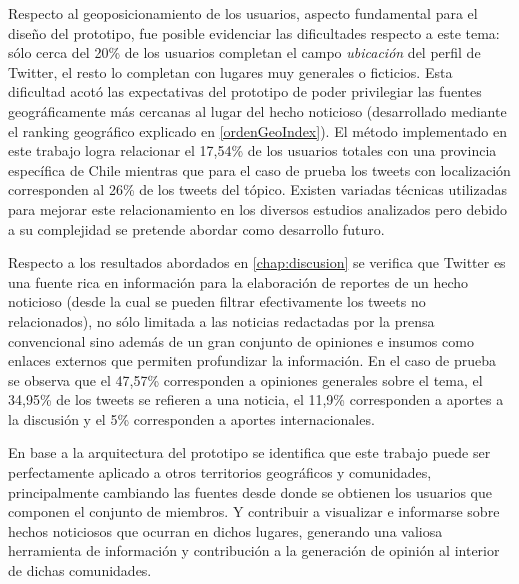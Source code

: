 Respecto al geoposicionamiento de los usuarios, aspecto fundamental para el diseño del prototipo, fue posible evidenciar las dificultades respecto a este tema: sólo cerca del 20\% de los usuarios completan el campo \emph{ubicación} del perfil de Twitter, el resto lo completan con lugares muy generales o ficticios. Esta dificultad acotó las expectativas del prototipo de poder privilegiar las fuentes geográficamente más cercanas al lugar del hecho noticioso (desarrollado mediante el ranking geográfico explicado en \ref{ordenGeoIndex}). El método implementado en este trabajo logra relacionar el 17,54\% de los usuarios totales con una provincia específica de Chile mientras que para el caso de prueba los tweets con localización corresponden al 26\% de los tweets del tópico. Existen variadas técnicas utilizadas para mejorar este relacionamiento en los diversos estudios analizados  \cite{Cheng:2010:YYT:1871437.1871535} \cite{McGee:2011:GST:2063576.2063959} pero debido a su complejidad se pretende abordar como desarrollo futuro. 






Respecto a los resultados abordados en \ref{chap:discusion} se verifica que Twitter es una fuente rica en información para la elaboración de reportes de un hecho noticioso (desde la cual se pueden filtrar efectivamente los tweets no relacionados), no sólo limitada a las noticias redactadas por la prensa convencional sino además de un gran conjunto de opiniones e insumos como enlaces externos que permiten profundizar la información. En el caso de prueba se observa que el 47,57\% corresponden a opiniones generales sobre el tema, el 34,95\% de los tweets se refieren a una noticia, el 11,9\% corresponden a aportes a la discusión y el 5\% corresponden a aportes internacionales.

En base a la arquitectura del prototipo se identifica que este trabajo puede ser perfectamente aplicado a otros territorios geográficos y comunidades, principalmente cambiando las fuentes desde donde se obtienen los usuarios que componen el conjunto de miembros. Y contribuir a visualizar e informarse sobre hechos noticiosos que ocurran en dichos lugares, generando una valiosa herramienta de información y contribución a la generación de opinión al interior de dichas comunidades.

